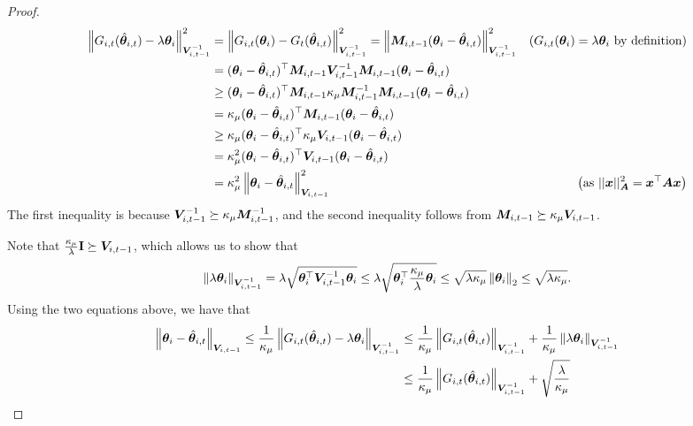 \begin{proof}
\begin{align*}
    \left\| G_{i,t}(\hat{\boldsymbol{\theta}}_{i,t})-\lambda\boldsymbol{\theta}_i \right\|_{\boldsymbol{V}_{i,t-1}^{-1}}^2 &=  \left\| G_{i,t}(\boldsymbol{\theta}_i) - G_t(\hat{\boldsymbol{\theta}}_{i,t}) \right\|_{\boldsymbol{V}_{i,t-1}^{-1}}^2 = \left\| \boldsymbol{M}_{i,t-1} (\boldsymbol{\theta}_i - \hat{\boldsymbol{\theta}}_{i,t}) \right\|_{\boldsymbol{V}_{i,t-1}^{-1}}^2 & \left( G_{i,t}(\boldsymbol{\theta}_i) = \lambda\boldsymbol{\theta}_i\text{ by definition} \right)\\
    & = (\boldsymbol{\theta}_i - \hat{\boldsymbol{\theta}}_{i,t})^{\top} \boldsymbol{M}_{i,t-1} \boldsymbol{V}_{i,t-1}^{-1} \boldsymbol{M}_{i,t-1} (\boldsymbol{\theta}_i - \hat{\boldsymbol{\theta}}_{i,t})\\
    &\geq (\boldsymbol{\theta}_i - \hat{\boldsymbol{\theta}}_{i,t})^{\top} \boldsymbol{M}_{i,t-1} \kappa_\mu \boldsymbol{M}_{i,t-1}^{-1} \boldsymbol{M}_{i,t-1} (\boldsymbol{\theta}_i - \hat{\boldsymbol{\theta}}_{i,t})\\
    & = \kappa_\mu(\boldsymbol{\theta}_i - \hat{\boldsymbol{\theta}}_{i,t})^{\top} \boldsymbol{M}_{i,t-1} (\boldsymbol{\theta}_i - \hat{\boldsymbol{\theta}}_{i,t})\\
    & \geq \kappa_\mu(\boldsymbol{\theta}_i - \hat{\boldsymbol{\theta}}_{i,t})^{\top} \kappa_\mu \boldsymbol{V}_{i,t-1} (\boldsymbol{\theta}_i - \hat{\boldsymbol{\theta}}_{i,t})\\
    & = \kappa_\mu^2 (\boldsymbol{\theta}_i - \hat{\boldsymbol{\theta}}_{i,t})^{\top} \boldsymbol{V}_{i,t-1} (\boldsymbol{\theta}_i - \hat{\boldsymbol{\theta}}_{i,t})\\
    & = \kappa_\mu^2 \left\| \boldsymbol{\theta}_i - \hat{\boldsymbol{\theta}}_{i,t} \right\|^2_{\boldsymbol{V}_{i,t-1}}  & \left(\text{as } ||\boldsymbol{x}||_{\boldsymbol{A}}^2 = \boldsymbol{x}^\top \boldsymbol{A} \boldsymbol{x} \right)
\end{align*}
The first inequality is because $\boldsymbol{V}^{-1}_{i,t-1} \succeq \kappa_\mu \boldsymbol{M}^{-1}_{i,t-1}$, and the second inequality follows from $\boldsymbol{M}_{i,t-1} \succeq \kappa_\mu \boldsymbol{V}_{i,t-1}$.

Note that $\frac{\kappa_\mu}{\lambda} \mathbf{I}\succeq\boldsymbol{V}_{i,t-1}$, which allows us to show that
\begin{equation}
\begin{split}
\left\| \lambda \boldsymbol{\theta}_i \right\|_{\boldsymbol{V}_{i,t-1}^{-1}} = \lambda \sqrt{ \boldsymbol{\theta}_i^{\top} \boldsymbol{V}_{i,t-1}^{-1} \boldsymbol{\theta}_i} \leq \lambda \sqrt{ \boldsymbol{\theta}_i^{\top} \frac{\kappa_\mu}{\lambda} \boldsymbol{\theta}_i} \leq \sqrt{\lambda\kappa_\mu} \left\| \boldsymbol{\theta}_i \right\|_2 \leq \sqrt{\lambda\kappa_\mu}.
\end{split}
\end{equation}
Using the two equations above, we have that
\begin{equation}
\begin{split}
\left\| \boldsymbol{\theta}_i - \hat{\boldsymbol{\theta}}_{i,t} \right\|_{\boldsymbol{V}_{i,t-1}} \le \frac{1}{\kappa_\mu} \left\| G_{i,t}(\hat{\boldsymbol{\theta}}_{i,t}) - \lambda \boldsymbol{\theta}_i \right\|_{\boldsymbol{V}_{i,t-1}^{-1}} &\leq \frac{1}{\kappa_\mu} \left\| G_{i,t}(\hat{\boldsymbol{\theta}}_{i,t}) \right\|_{\boldsymbol{V}_{i,t-1}^{-1}} + \frac{1}{\kappa_\mu}\left\| \lambda \boldsymbol{\theta}_i \right\|_{\boldsymbol{V}_{i,t-1}^{-1}} \\
&\leq \frac{1}{\kappa_\mu} \left\| G_{i,t}(\hat{\boldsymbol{\theta}}_{i,t}) \right\|_{\boldsymbol{V}_{i,t-1}^{-1}} + \sqrt{\frac{\lambda}{\kappa_\mu}}
\end{split}
\end{equation}



\end{proof}
